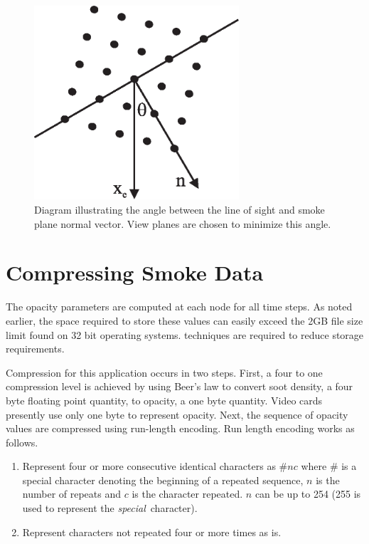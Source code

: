\documentclass[11pt,twoside]{book}
\begin{document}
\begin{figure}
\centerline{\includegraphics[width=3.0in]{figures/figDIRB}}
\caption{Diagram illustrating the angle between the line of sight
and smoke plane normal vector.  View planes are chosen to minimize
this angle.} \label{figDIRB}
\end{figure}

%
%

\chapter{Compressing Smoke Data}

The opacity parameters are computed at each node for all time
steps. As noted earlier, the space required to store these values can easily exceed the 2GB file size limit found on 32
bit operating systems.
techniques are required to reduce storage requirements.

Compression for this application occurs in two steps.  First, a four to one compression level is achieved by using Beer's
law to convert soot density, a four byte floating point quantity, to opacity, a one byte quantity.  Video cards presently use only one byte to represent opacity.
Next, the sequence of opacity values are compressed using run-length encoding.
Run length encoding works as follows.

\begin{enumerate}
\item Represent four or more consecutive identical characters as $\# n c$
where $\#$ is a special character denoting the beginning of a
repeated sequence, $n$ is the number of repeats and $c$ is the
character repeated.  $n$ can be up to 254 (255 is used to represent the {\em special}\ character).
\item Represent characters not repeated four or more times as is.
\end{enumerate}
\end{document}

